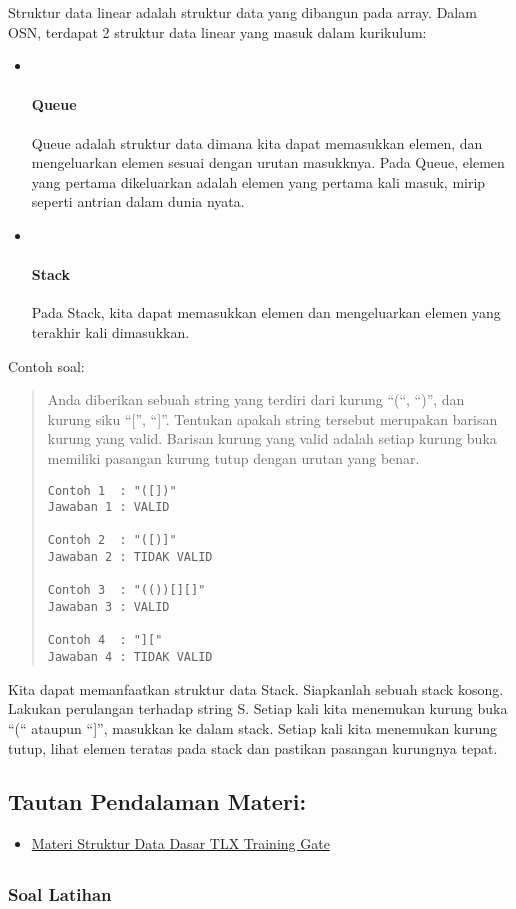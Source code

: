 \documentclass[]{article}
\providecommand{\tightlist}{%
  \setlength{\itemsep}{0pt}\setlength{\parskip}{0pt}}
\let\oldparagraph\paragraph
\renewcommand{\paragraph}[1]{\oldparagraph{#1}\mbox{}}
\begin{document}
Struktur data linear adalah struktur data yang dibangun pada array.
Dalam OSN, terdapat 2 struktur data linear yang masuk dalam kurikulum:

\begin{itemize}
\item ~
  \paragraph{Queue}\label{queue}

  Queue adalah struktur data dimana kita dapat memasukkan elemen, dan
  mengeluarkan elemen sesuai dengan urutan masukknya. Pada Queue, elemen
  yang pertama dikeluarkan adalah elemen yang pertama kali masuk, mirip
  seperti antrian dalam dunia nyata.
\item ~
  \paragraph{Stack}\label{stack}

  Pada Stack, kita dapat memasukkan elemen dan mengeluarkan elemen yang
  terakhir kali dimasukkan.
\end{itemize}

Contoh soal:

\begin{quote}
Anda diberikan sebuah string yang terdiri dari kurung ``(``, ``)'', dan
kurung siku ``{[}'', ``{]}''. Tentukan apakah string tersebut merupakan
barisan kurung yang valid. Barisan kurung yang valid adalah setiap
kurung buka memiliki pasangan kurung tutup dengan urutan yang benar.

\begin{verbatim}
Contoh 1  : "([])"
Jawaban 1 : VALID

Contoh 2  : "([)]"
Jawaban 2 : TIDAK VALID

Contoh 3  : "(())[][]"
Jawaban 3 : VALID

Contoh 4  : "]["
Jawaban 4 : TIDAK VALID
\end{verbatim}
\end{quote}

Kita dapat memanfaatkan struktur data Stack. Siapkanlah sebuah stack
kosong. Lakukan perulangan terhadap string S. Setiap kali kita menemukan
kurung buka ``(`` ataupun ``{]}'', masukkan ke dalam stack. Setiap kali
kita menemukan kurung tutup, lihat elemen teratas pada stack dan
pastikan pasangan kurungnya tepat.

\subsection{Tautan Pendalaman Materi:}\label{tautan-pendalaman-materi}

\begin{itemize}
\tightlist
\item
  \href{https://training.ia-toki.org/training/curriculums/1/courses/11/chapters/56/lessons/25/}{Materi
  Struktur Data Dasar TLX Training Gate}
\end{itemize}

\subsection{}\label{rekomandasi-soal-soal-latihan}

\subsubsection{Soal Latihan}\label{soal-latihan-5}
\end{document}
